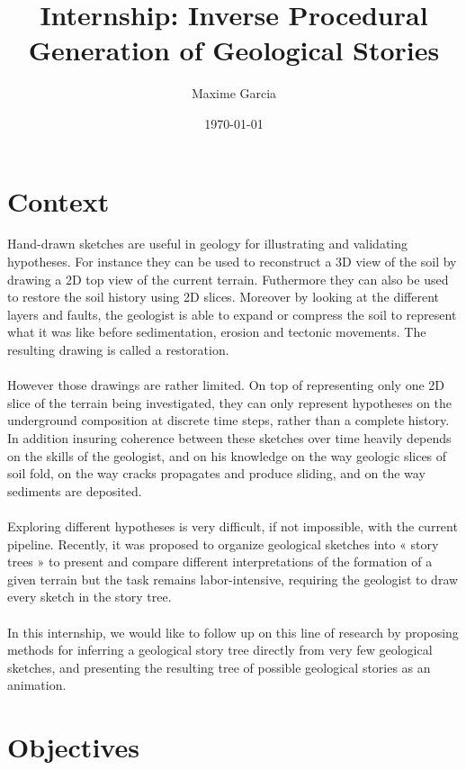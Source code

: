 \documentclass[a4paper,11pt]{article}
\title{Internship: Inverse Procedural Generation of Geological Stories}
\author{Maxime Garcia}
\date{\today}
\begin{document}
\maketitle
\section{Context}


Hand-drawn sketches are useful in geology for illustrating and validating hypotheses. For instance they can be used to reconstruct a 3D view of the soil by drawing a 2D top view of the current terrain\cite{brazil}. Futhermore they can also be used to restore the soil history using 2D slices. Moreover by looking at the different layers and faults, the geologist is able to expand or compress the soil to represent what it was like before sedimentation, erosion and tectonic movements. The resulting drawing is called a restoration.\\\\
However those drawings are rather limited. On top of representing only one 2D slice of the terrain being investigated, they can only represent hypotheses on the underground composition at discrete time steps, rather than a complete history. 
In addition insuring coherence between these sketches over time heavily depends on the skills of the geologist, and on his knowledge on the way geologic slices of soil fold, on the way cracks propagates and produce sliding, and on the way sediments are deposited.\\\\ 
Exploring different hypotheses is very difficult, if not impossible, with the current pipeline.
Recently, it was proposed to organize geological sketches into « story trees » to present and
compare different interpretations of the formation of a given terrain \cite{lidal} but the task remains
labor-intensive, requiring the geologist to draw every sketch in the story tree. \\\\
In this internship, we would like to follow up on this line of research by proposing methods for inferring a
geological story tree directly from very few geological sketches, and presenting the resulting tree of
possible geological stories as an animation.

\section{Objectives}
\end{document}
